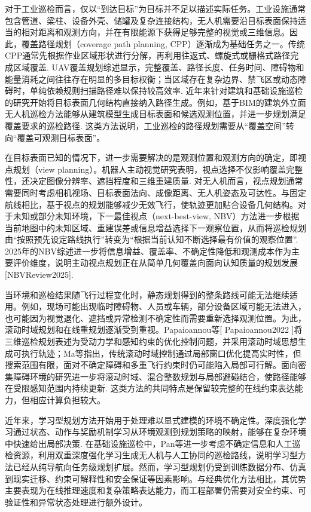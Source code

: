 对于工业巡检而言，仅以“到达目标”为目标并不足以描述实际任务。工业设施通常包含管道、梁柱、设备外壳、储罐及复杂连接结构，无人机需要沿目标表面保持适当的相对距离和观测方向，并在有限能源下获得足够完整的视觉或三维信息。因此，覆盖路径规划（coverage path planning, CPP）逐渐成为基础任务之一。传统CPP通常先根据作业区域形状进行分解，再利用往返式、螺旋式或栅格式路径完成区域覆盖\cite{Oksanen2009,Galceran2013,Choset2001}. UAV覆盖规划综述显示，完整覆盖、路径长度、任务时间、障碍物和能量消耗之间往往存在明显的多目标权衡；当区域存在复杂边界、禁飞区或动态障碍时，单纯依赖规则扫描路径难以保持较高效率\cite{Cabreira2019,Kumar2023}. 近年来针对建筑和基础设施巡检的研究开始将目标表面几何结构直接纳入路径生成。例如，基于BIM的建筑外立面无人机巡检方法能够从建筑模型生成目标表面和候选观测位置，并进一步规划满足覆盖要求的巡检路径\cite{Huang2023BIM}. 这类方法说明，工业巡检的路径规划需要从“覆盖空间”转向“覆盖可观测目标表面”。

在目标表面已知的情况下，进一步需要解决的是观测位置和观测方向的确定，即视点规划（view planning）。机器人主动视觉研究表明，视点选择不仅影响覆盖完整性，还决定图像分辨率、遮挡程度和三维重建质量\cite{Zeng2020}. 对无人机而言，视点规划通常需要同时考虑相机视场、目标表面法向、成像距离、无人机姿态及可达性。与固定航线相比，基于视点的规划能够减少无效飞行，使轨迹更加贴合设备几何结构。对于未知或部分未知环境，下一最佳视点（next-best-view, NBV）方法进一步根据当前地图中的未知区域、重建误差或信息增益选择下一观察位置，从而将巡检规划由“按照预先设定路线执行”转变为“根据当前认知不断选择最有价值的观察位置”\cite{Bircher2016,Zeng2020,Alsadik2025NBV}. 2025年的NBV综述进一步将信息增益、覆盖率、不确定性降低和观测成本作为主要评价维度，说明主动视点规划正在从简单几何覆盖向面向认知质量的规划发展[NBVReview2025].

当环境和巡检结果随飞行过程变化时，静态规划得到的整条路线可能无法继续适用。例如，现场可能出现临时障碍物、人员或车辆，部分设备区域可能无法进入，也可能因为视觉退化、遮挡或异常检测不确定性而需要重新选择观测位置。为此，滚动时域规划和在线重规划逐渐受到重视。Papaioannou等[ Papaioannou2022 ]将三维巡检规划表述为受动力学和感知约束的优化控制问题，并采用滚动时域思想生成可执行轨迹；Ma等\cite{Ma2022}指出，传统滚动时域控制通过局部窗口优化提高实时性，但搜索范围有限，面对不确定障碍和多重飞行约束时仍可能陷入局部可行解。面向密集障碍环境的研究进一步将滚动时域、混合整数规划与局部避碰结合，使路径能够在受限感知范围内持续更新\cite{Hu2024}. 这类方法的共同特点是保留较完整的在线约束表达能力，但相应计算负担较大。

近年来，学习型规划方法开始用于处理难以显式建模的环境不确定性。深度强化学习通过状态、动作与奖励机制学习从环境观测到规划策略的映射，能够在复杂环境中快速给出局部决策\cite{Kumar2025}. 在基础设施巡检中，Pan等\cite{Pan2024}进一步考虑不确定信息和人工巡检资源，利用双重深度强化学习生成无人机与人工协同的巡检路线，说明学习型方法已经从纯导航向任务级规划扩展。然而，学习型规划仍受到训练数据分布、仿真到现实迁移、约束可解释性和安全保证等因素影响。与经典优化方法相比，其优势主要表现为在线推理速度和复杂策略表达能力，而工程部署仍需要对安全约束、可验证性和异常状态处理进行额外设计。

